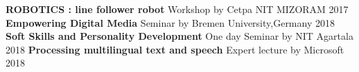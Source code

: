 \begin{cvhonors}
  \cvhonor
    {\textbf{ROBOTICS : line follower robot}}
    {Workshop by Cetpa}
    {NIT MIZORAM}
    {2017}
    \cvhonor
    {\textbf{Empowering Digital Media}}
    {Seminar by Bremen University,Germany}
    {}
    {2018}
    \cvhonor
    {\textbf{Soft Skills and Personality Development}}
    {One day Seminar by NIT Agartala}
    {}
    {2018}
    \cvhonor
    {\textbf{Processing multilingual text and speech}}
    {Expert lecture by Microsoft}
    {}
    {2018}
\end{cvhonors}
